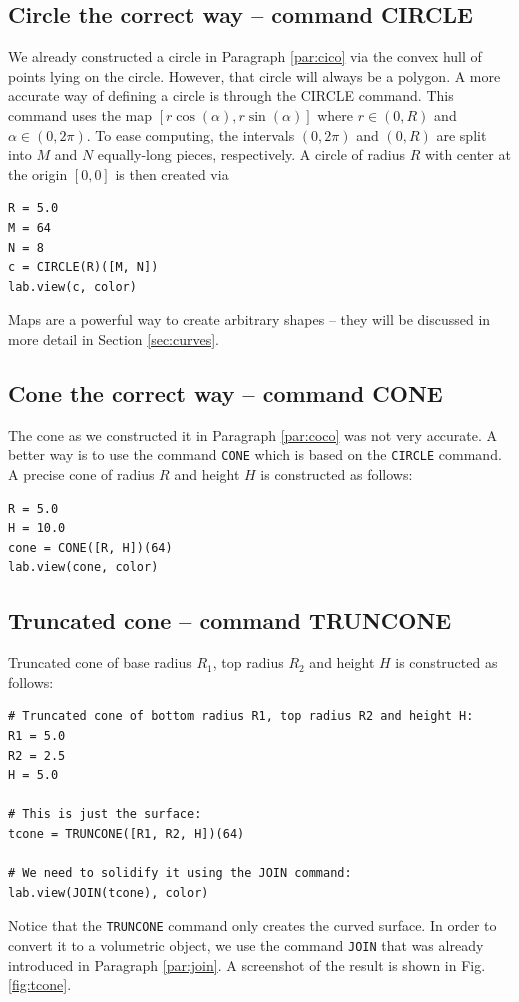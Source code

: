 \documentclass[article,A4,12pt]{llncs}
\begin{document}
\subsection{Circle the correct way -- command CIRCLE}

We already constructed a circle in Paragraph \ref{par:cico} via the convex 
hull of points lying on the circle. However, that circle will always be 
a polygon. A more accurate way of defining a circle is through the 
CIRCLE command. This command uses the map $[r \cos(\alpha), r \sin(\alpha)]$
where $r \in (0, R)$ and $\alpha \in (0, 2\pi)$. To ease computing, the 
intervals $(0, 2\pi)$ and $(0, R)$ are split into $M$ and $N$ equally-long 
pieces, respectively. A circle of radius $R$ with center at the origin $[0, 0]$
is then created via 

\begin{verbatim}
R = 5.0
M = 64
N = 8
c = CIRCLE(R)([M, N])
lab.view(c, color)
\end{verbatim}
Maps are a powerful way to create arbitrary shapes -- they will be discussed in 
more detail in Section \ref{sec:curves}.

\subsection{Cone the correct way -- command CONE}

The cone as we constructed it in Paragraph \ref{par:coco} was not 
very accurate. A better way is to use the command {\tt CONE} which 
is based on the {\tt CIRCLE} command. A precise cone of radius 
$R$ and height $H$ is constructed as follows:
\begin{verbatim}
R = 5.0
H = 10.0
cone = CONE([R, H])(64)
lab.view(cone, color)
\end{verbatim}

\subsection{Truncated cone -- command TRUNCONE}

Truncated cone of base radius $R_1$, top radius $R_2$ and height $H$
is constructed as follows:

\begin{verbatim}
# Truncated cone of bottom radius R1, top radius R2 and height H:
R1 = 5.0
R2 = 2.5
H = 5.0

# This is just the surface:
tcone = TRUNCONE([R1, R2, H])(64)

# We need to solidify it using the JOIN command:
lab.view(JOIN(tcone), color)
\end{verbatim}
Notice that the {\tt TRUNCONE} command only creates the curved surface.
In order to convert it to a volumetric object, we use the command 
{\tt JOIN} that was already introduced in Paragraph \ref{par:join}.
A screenshot of the result is shown in Fig. \ref{fig:tcone}.
\end{document}
